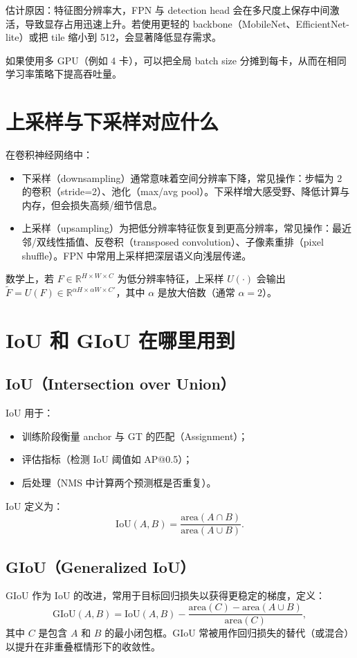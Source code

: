 \documentclass[11pt,a4paper]{article}
\begin{document}
估计原因：特征图分辨率大，FPN 与 detection head 会在多尺度上保存中间激活，导致显存占用迅速上升。若使用更轻的 backbone（MobileNet、EfficientNet-lite）或把 tile 缩小到 512，会显著降低显存需求。

如果使用多 GPU（例如 4 卡），可以把全局 batch size 分摊到每卡，从而在相同学习率策略下提高吞吐量。

\section{上采样与下采样对应什么}
在卷积神经网络中：
\begin{itemize}
  \item 下采样（downsampling）通常意味着空间分辨率下降，常见操作：步幅为 2 的卷积（stride=2）、池化（max/avg pool）。下采样增大感受野、降低计算与内存，但会损失高频/细节信息。
  \item 上采样（upsampling）为把低分辨率特征恢复到更高分辨率，常见操作：最近邻/双线性插值、反卷积（transposed convolution）、子像素重排（pixel shuffle）。FPN 中常用上采样把深层语义向浅层传递。
\end{itemize}

数学上，若 $F\in\mathbb{R}^{H\times W\times C}$ 为低分辨率特征，上采样 $U(\cdot)$ 会输出 $\tilde F=U(F)\in\mathbb{R}^{\alpha H\times \alpha W\times C'}$，其中 $\alpha$ 是放大倍数（通常 $\alpha=2$）。

\section{IoU 和 GIoU 在哪里用到}
\subsection*{IoU（Intersection over Union）}
IoU 用于：
\begin{itemize}
  \item 训练阶段衡量 anchor 与 GT 的匹配（Assignment）；
  \item 评估指标（检测 IoU 阈值如 AP@0.5）；
  \item 后处理（NMS 中计算两个预测框是否重复）。
\end{itemize}

IoU 定义为：
\[
\mathrm{IoU}(A,B)=\frac{\mathrm{area}(A\cap B)}{\mathrm{area}(A\cup B)}.
\]

\subsection*{GIoU（Generalized IoU）}
GIoU 作为 IoU 的改进，常用于目标回归损失以获得更稳定的梯度，定义：
\[
\mathrm{GIoU}(A,B)=\mathrm{IoU}(A,B)-\frac{\mathrm{area}(C)-\mathrm{area}(A\cup B)}{\mathrm{area}(C)},
\]
其中 $C$ 是包含 $A$ 和 $B$ 的最小闭包框。GIoU 常被用作回归损失的替代（或混合）以提升在非重叠框情形下的收敛性。
\end{document}
